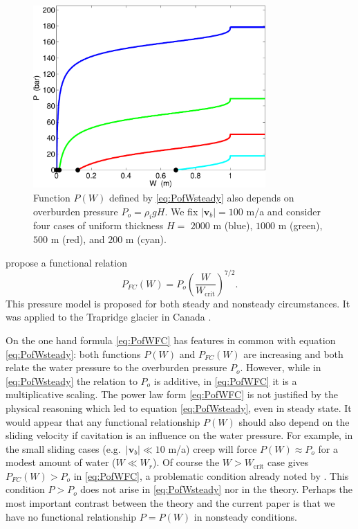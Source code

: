 \documentclass[11pt,final]{amsart}%
\newcommand\bv{\mathbf{v}}
\begin{document}
\begin{figure}[ht]
\includegraphics[width=3.5in,keepaspectratio=true]{figs/psteady-Po}
\medskip
\caption{Function $P(W)$ defined by \eqref{eq:PofWsteady} also depends on overburden pressure $P_o=\rho_i g H$.  We fix $|\bv_b|=100$ m/a and consider four cases of uniform thickness $H=$ $2000$ m (blue), $1000$ m (green), $500$ m (red), and $200$ m (cyan).}
\label{fig:psteady-Po}
\end{figure}

\cite{FlowersClarke2002_theory} propose a functional relation
\begin{equation}
P_{FC}(W) = P_o \left(\frac{W}{W_{\text{crit}}}\right)^{7/2}. \label{eq:PofWFC}
\end{equation}
This pressure model is proposed for both steady and nonsteady circumstances.  It was applied to the Trapridge glacier in Canada \cite{FlowersClarke2002_trapridge}.

On the one hand formula \eqref{eq:PofWFC} has features in common with equation \eqref{eq:PofWsteady}: both functions $P(W)$ and $P_{FC}(W)$ are increasing and both relate the water pressure to the overburden pressure $P_o$.  However, while in \eqref{eq:PofWsteady} the relation to $P_o$ is additive, in \eqref{eq:PofWFC} it is a multiplicative scaling.  The power law form \eqref{eq:PofWFC} is not justified by the physical reasoning which led to equation \eqref{eq:PofWsteady}, even in steady state.   It would appear that any functional relationship $P(W)$ should also depend on the sliding velocity if cavitation is an influence on the water pressure.  For example, in the small sliding cases (e.g.~$|\bv_b| \ll 10$ m/a) creep will force $P(W) \approx P_o$ for a modest amount of water ($W\ll W_r$).  Of course the $W>W_{\text{crit}}$ case gives $P_{FC}(W) > P_o$ in \eqref{eq:PofWFC}, a problematic condition already noted by \cite{Schoofetal2012}.  This condition $P>P_o$ does not arise in \eqref{eq:PofWsteady} nor in the \cite{Schoofetal2012} theory.  Perhaps the most important contrast between the \cite{FlowersClarke2002_theory} theory and the current paper is that we have no functional relationship $P=P(W)$ in nonsteady conditions.
\end{document}
